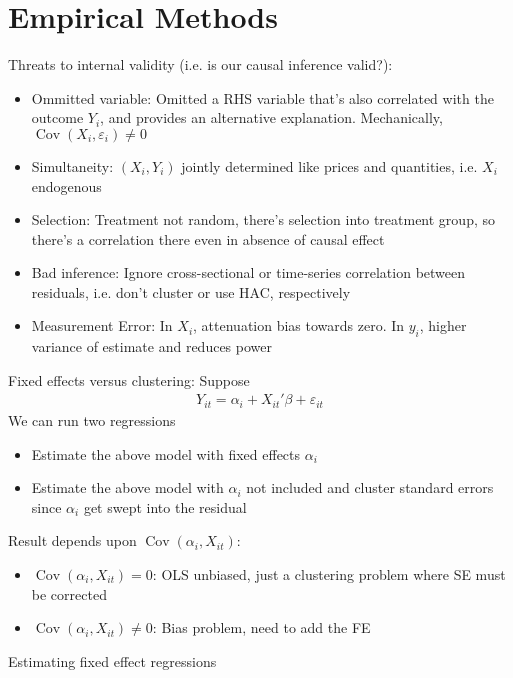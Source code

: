 \documentclass[12pt]{article}
\theoremstyle{plain}
\theoremstyle{definition}
\theoremstyle{remark}
\newcommand{\Cov}{\operatorname{Cov}}
\begin{document}
\clearpage
\section{Empirical Methods}

Threats to internal validity (i.e. is our causal inference valid?):
\begin{itemize}
  \item Ommitted variable:
    Omitted a RHS variable that's also correlated with the outcome
    $Y_i$, and provides an alternative explanation.
    Mechanically, $\Cov(X_i,\varepsilon_i)\neq 0$
  \item Simultaneity: $(X_i,Y_i)$ jointly determined like prices and
    quantities, i.e. $X_i$ endogenous
  \item Selection: Treatment not random, there's selection into
    treatment group, so there's a correlation there even in absence of
    causal effect
  \item Bad inference: Ignore cross-sectional or time-series correlation
    between residuals, i.e. don't cluster or use HAC, respectively
  \item Measurement Error: In $X_i$, attenuation bias towards zero. In
    $y_i$, higher variance of estimate and reduces power
\end{itemize}
Fixed effects versus clustering:
Suppose
\begin{align*}
  Y_{it} = \alpha_i + X_{it}'\beta + \varepsilon_{it}
\end{align*}
We can run two regressions
\begin{itemize}
  \item Estimate the above model with fixed effects $\alpha_i$
  \item Estimate the above model with $\alpha_i$ not included and
    cluster standard errors since $\alpha_i$ get swept into the
    residual
\end{itemize}
Result depends upon $\Cov(\alpha_i,X_{it})$:
\begin{itemize}
  \item $\Cov(\alpha_i,X_{it})=0$:
    OLS unbiased, just a clustering problem where SE must be corrected
  \item $\Cov(\alpha_i,X_{it})\neq 0$:
    Bias problem, need to add the FE
\end{itemize}
Estimating fixed effect regressions
\end{document}
